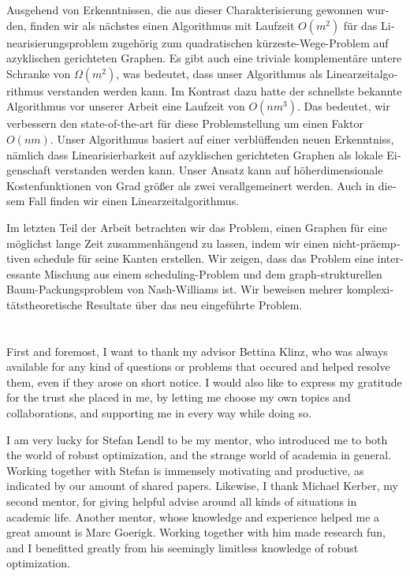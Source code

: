 \documentclass[twoside,openright,bibliography=totoc]{scrreprt}
\begin{document}
\begin{otherlanguage}{ngerman}
Ausgehend von Erkenntnissen, die aus dieser Charakterisierung gewonnen wurden, finden wir als nächstes einen Algorithmus mit Laufzeit $O(m^2)$ für das Linearisierungsproblem zugehörig zum quadratischen kürzeste-Wege-Problem auf azyklischen gerichteten Graphen. 
Es gibt auch eine triviale komplementäre untere Schranke von $\Omega(m^2)$, was bedeutet, dass unser Algorithmus als Linearzeitalgorithmus verstanden werden kann.
Im Kontrast dazu hatte der schnellste bekannte Algorithmus vor unserer Arbeit eine Laufzeit von $O(nm^3)$. 
Das bedeutet, wir verbessern den state-of-the-art für diese Problemstellung um einen Faktor $O(nm)$. 
Unser Algorithmus basiert auf einer verblüffenden neuen Erkenntniss, nämlich dass Linearisierbarkeit auf azyklischen gerichteten Graphen als lokale Eigenschaft verstanden werden kann.
Unser Ansatz kann auf höherdimensionale Kostenfunktionen von Grad größer als zwei verallgemeinert werden. Auch in diesem Fall finden wir einen Linearzeitalgorithmus.


Im letzten Teil der Arbeit betrachten wir das Problem, einen Graphen für eine möglichst lange Zeit zusammenhängend zu lassen, indem wir einen nicht-präemptiven schedule für seine Kanten erstellen. Wir zeigen, dass das Problem eine interessante Mischung aus einem scheduling-Problem und dem graph-strukturellen Baum-Packungsproblem von Nash-Williams ist. Wir beweisen mehrer komplexitätstheoretische Resultate über das neu eingeführte Problem.


\end{otherlanguage}




\cleardoublepage

\chapter*{}

First and foremost, I want to thank my advisor Bettina Klinz, who was always available for any kind of questions or problems that occured and helped resolve them, even if they arose on short notice. I would also like to express my gratitude for the trust she placed in me, by letting me choose my own topics and collaborations, and supporting me in every way while doing so.

I am very lucky for Stefan Lendl to be my mentor, who introduced me to both the world of robust optimization, and the strange world of academia in general. Working together with Stefan is immensely motivating and productive, as indicated by our amount of shared papers. 
Likewise, I thank Michael Kerber, my second mentor, for giving helpful advise around all kinds of situations in academic life. 
Another mentor, whose knowledge and experience helped me a great amount is Marc Goerigk. Working together with him made research fun, and I benefitted greatly from his seemingly limitless knowledge of robust optimization.
\end{document}
